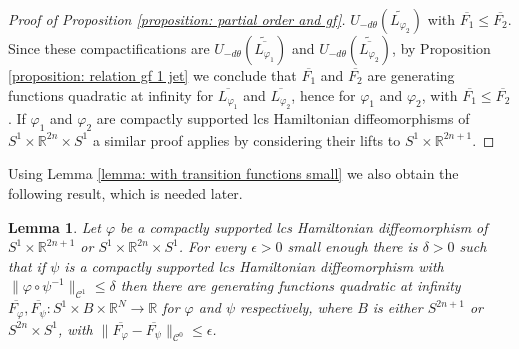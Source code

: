 \documentclass{amsart}
\newtheorem{lemma}[thm]{Lemma}
\theoremstyle{remark}
\begin{document}
\begin{proof}[Proof of Proposition \ref{proposition: partial order and gf}]
$U_{-d\theta} (\widetilde{L_{\varphi_2}})$
with $\overline{F_1} \leq \overline{F_2}$.
Since these compactifications are
$U_{-d\theta} (\widetilde{\overline{L_{\varphi_1}}})$ and
$U_{-d\theta} (\widetilde{\overline{L_{\varphi_2}}})$,
by Proposition \ref{proposition: relation gf 1 jet}
we conclude that $\overline{F_1}$ and $\overline{F_2}$
are generating functions quadratic at infinity
for $\overline{L_{\varphi_1}}$ and $\overline{L_{\varphi_2}}$,
hence for $\varphi_1$ and $\varphi_2$,
with $\overline{F_1} \leq \overline{F_2}$.
If $\varphi_1$ and $\varphi_2$
are compactly supported lcs Hamiltonian diffeomorphisms
of $S^1 \times \mathbb{R}^{2n} \times S^1$
a similar proof applies by considering their lifts
to $S^1 \times \mathbb{R}^{2n+1}$.
\end{proof}

Using Lemma \ref{lemma: with transition functions small}
we also obtain the following result,
which is needed later.

\begin{lemma}\label{lemma: gf of close lcs diffeomorphisms}
Let $\varphi$ be a compactly supported lcs Hamiltonian diffeomorphism
of $S^1 \times \mathbb{R}^{2n+1}$ or $S^1 \times \mathbb{R}^{2n} \times S^1$.
For every $\epsilon > 0$ small enough
there is $\delta > 0$
such that if $\psi$ is a compactly supported
lcs Hamiltonian diffeomorphism
with $\lVert \varphi \circ \psi^{-1} \rVert_{\mathcal{C}^1} \leq \delta$
then there are generating functions quadratic at infinity
$\overline{F_{\varphi}}, \overline{F_{\psi}}:
S^1 \times B \times \mathbb{R}^N \rightarrow \mathbb{R}$
for $\varphi$ and $\psi$ respectively,
where $B$ is either $S^{2n+1}$ or $S^{2n} \times S^1$,
with
$\lVert \overline{F_{\varphi}} - \overline{F_{\psi}} \rVert_{\mathcal{C}^0}
\leq \epsilon$.
\end{lemma}
\end{document}
